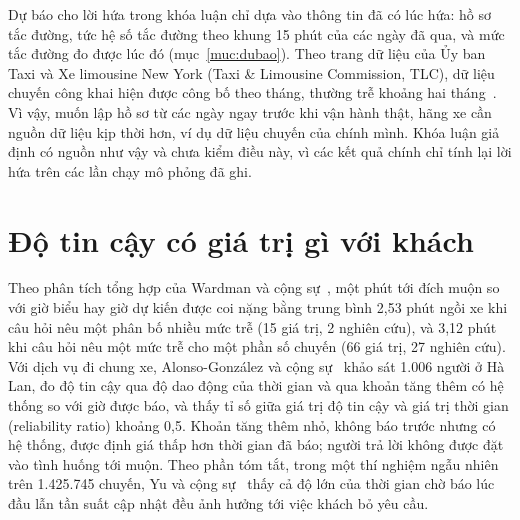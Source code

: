 Dự báo cho lời hứa trong khóa luận chỉ dựa vào thông tin đã có lúc hứa: hồ sơ tắc đường, tức hệ số tắc đường theo
khung 15 phút của các ngày đã qua, và mức tắc đường đo được lúc đó (mục~\ref{muc:dubao}). Theo trang dữ liệu của Ủy
ban Taxi và Xe limousine New York (Taxi \& Limousine Commission, TLC), dữ liệu chuyến công khai hiện được công bố theo
tháng, thường trễ khoảng hai tháng~\cite{tlc}. Vì vậy, muốn lập hồ sơ từ các ngày ngay trước khi vận hành thật, hãng
xe cần nguồn dữ liệu kịp thời hơn, ví dụ dữ liệu chuyến của chính mình. Khóa luận giả định có nguồn như vậy và chưa
kiểm điều này, vì các kết quả chính chỉ tính lại lời hứa trên các lần chạy mô phỏng đã ghi.

\section{Độ tin cậy có giá trị gì với khách}
\label{muc:c2-giatri}

Theo phân tích tổng hợp của Wardman và cộng sự~\cite{wardman2026}, một phút tới đích muộn so với giờ biểu hay giờ dự
kiến được coi nặng bằng trung bình 2,53 phút ngồi xe khi câu hỏi nêu một phân bố nhiều mức trễ (15 giá trị, 2
nghiên cứu), và 3,12 phút khi câu hỏi nêu một mức trễ cho một phần số chuyến (66 giá trị, 27 nghiên cứu). Với
dịch vụ đi chung xe, Alonso-González và cộng sự~\cite{alonsogonzalez2020} khảo sát 1.006 người ở Hà Lan, đo độ tin cậy
qua độ dao động của thời gian và qua khoản tăng thêm có hệ thống so với giờ được báo, và thấy tỉ số giữa giá trị độ
tin cậy và giá trị thời gian (reliability ratio) khoảng 0,5. Khoản tăng thêm nhỏ, không báo trước nhưng có hệ thống,
được định giá thấp hơn thời gian đã báo; người trả lời không được đặt vào tình huống tới muộn. Theo phần tóm tắt, trong
một thí nghiệm ngẫu nhiên trên 1.425.745 chuyến, Yu và cộng sự~\cite{yu2022} thấy cả độ lớn của thời gian chờ báo lúc
đầu lẫn tần suất cập nhật đều ảnh hưởng tới việc khách bỏ yêu cầu.

